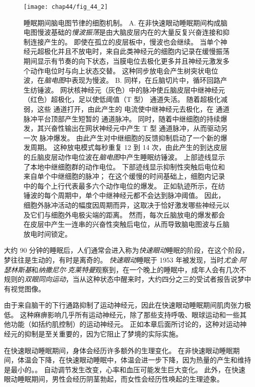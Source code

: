 \begin{figure}[htbp]
	\centering
	\texttt{[image: chap44/fig\_44\_2]}
	\caption{睡眠期间脑电图节律的细胞机制。
		A. 在非快速眼动睡眠期间构成脑电图慢波基础的\textit{慢波振荡}是由大脑皮层内在的大量反复兴奋连接和抑制连接产生的。
		即使在孤立的皮层板中，慢波也会继续。
		当单个神经元超极化并且不放电时，来自此类神经元的细胞内记录在缓慢振荡期间显示有节奏的向下状态，当膜电位去极化更多并且神经元激发多个动作电位时与向上状态交替。
		这种同步放电会产生树突状电位波，在\textit{脑电图}中表现为慢波。
		B. 同样，在丘脑切片中，循环回路产生纺锤波。
		网状核神经元（灰色）中的脉冲使丘脑皮层中继神经元（红色）超极化，足以使低阈值（T 型） 通道失活。
		随着超极化减弱，这些  通道打开，由此产生的  电流使中继神经元去极化，在  通道脉冲平台顶部产生短暂的  通道脉冲。
		同时，随着中继细胞的持续爆发，其兴奋性输出在网状神经元中产生 T 型  通道脉冲，从而驱动另一次  脉冲爆发。
		由此产生对中继细胞的反馈抑制启动了一个新的爆发周期。
		这种放电模式每秒重复 12 到 14 次，由此产生的到达皮层的丘脑皮层动作电位波在\textit{脑电图}中产生睡眠纺锤波。
		上部迹线显示了本地中继细胞群的动作电位。
		下部迹线显示抑制性突触后电位和来自单个中继细胞的脉冲；
		在这个缓慢的时间基础上，细胞内记录中的每个上行代表最多六个动作电位的爆发。
		正如轨迹所示，在纺锤波的每个周期中，单个中继神经元都不会达到脉冲阈值。
		因此，细胞外脉冲活动的幅度因周期而异，这取决于恰好激发哪些神经元以及它们与细胞外电极尖端的距离。
		然而，每次丘脑放电的爆发都会在皮层中产生一连串的兴奋性突触后电位，从而导致脑电图波与丘脑放电时间锁定\cite{bal1995synaptic}。}
	\label{fig:44_2}
\end{figure}


大约 90 分钟的睡眠后，人们通常会进入称为\textit{快速眼动}睡眠的阶段，在这个阶段，梦往往是生动的，有时是离奇的。
\textit{快速眼动}睡眠于 1953 年被发现，当时\textit{尤金$\cdot$阿瑟林斯基}和\textit{纳撒尼尔$\cdot$克莱特曼}观察到，在一个晚上的睡眠中，成年人会有几次不规则的\textit{双眼同向运动}，当从这种状态中醒来时，大约四分之三的受试者报告说梦中有视觉图像。


由于来自脑干的下行通路抑制了运动神经元，因此在快速眼动睡眠期间肌肉张力极低。
这种麻痹影响几乎所有运动神经元，除了那些支持呼吸、眼球运动和一些其他功能（如括约肌控制）的运动神经元。
正如本章后面所讨论的，这种对运动神经元的抑制是至关重要的，因为它阻止了梦境的实际实施。


在快速眼动睡眠期间，身体会经历许多额外的生理变化。
在非快速眼动睡眠期间，体温会下降，在快速眼动睡眠中，体温会进一步下降，因为热量的产生和维持是最小的。。
自动调节发生改变，心率和血压可能发生巨大变化。
此外，在快速眼动睡眠期间，男性会经历阴茎勃起，而女性会经历性唤起的生理迹象。


